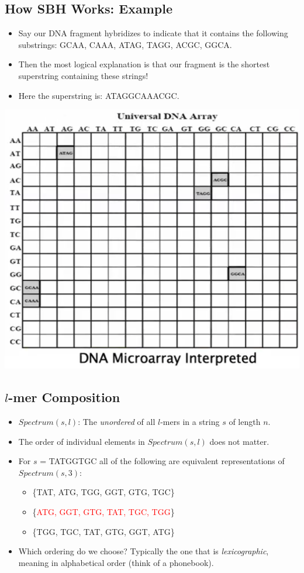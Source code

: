 \documentclass[10pt]{article}
\begin{document}
\subsection*{How SBH Works: Example}
\begin{itemize}
    \item Say our DNA fragment hybridizes to indicate that it contains the following substrings: GCAA, CAAA, ATAG, TAGG, ACGC, GGCA.
    \item Then the most logical explanation is that our fragment is the shortest superstring containing these strings!
    \item Here the superstring is: ATAGGCAAACGC.
\end{itemize}
\begin{center}
    \includegraphics*[scale=0.8]{W4_9.png}
\end{center}

\subsection*{$l$-mer Composition}
\begin{itemize}
    \item $Spectrum(s, l)$: The \textit{unordered} of all $l$-mers in a string $s$ of length $n$.
    \item The order of individual elements in $Spectrum(s, l)$ does not matter.
    \item For $s$ = TATGGTGC all of the following are equivalent representations of $Spectrum(s, 3)$:
    \begin{itemize}
        \item \{TAT, ATG, TGG, GGT, GTG, TGC\}
        \item \{\textcolor{red}{ATG, GGT, GTG, TAT, TGC, TGG}\}
        \item \{TGG, TGC, TAT, GTG, GGT, ATG\}
    \end{itemize}
    \item Which ordering do we choose?  Typically the one that is \textit{lexicographic}, meaning in alphabetical order (think of a phonebook).
\end{itemize}
\end{document}
